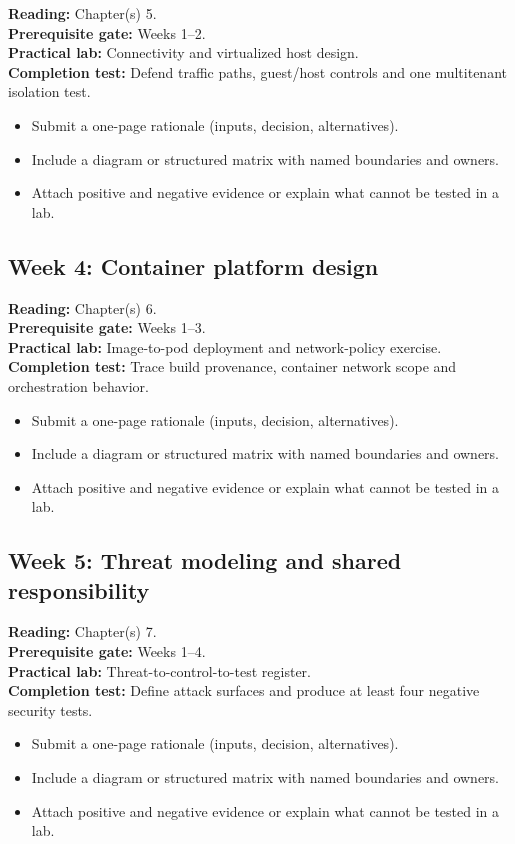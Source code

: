 \documentclass[10pt,letterpaper]{article}
\begin{document}
\textbf{Reading:} Chapter(s) 5.\\
\textbf{Prerequisite gate:} Weeks 1--2.\\
\textbf{Practical lab:} Connectivity and virtualized host design.\\
\textbf{Completion test:} Defend traffic paths, guest/host controls and one multitenant isolation test.
\begin{itemize}
\item Submit a one-page rationale (inputs, decision, alternatives).
\item Include a diagram or structured matrix with named boundaries and owners.
\item Attach positive and negative evidence or explain what cannot be tested in a lab.
\end{itemize}
\subsection{Week 4: Container platform design}
\textbf{Reading:} Chapter(s) 6.\\
\textbf{Prerequisite gate:} Weeks 1--3.\\
\textbf{Practical lab:} Image-to-pod deployment and network-policy exercise.\\
\textbf{Completion test:} Trace build provenance, container network scope and orchestration behavior.
\begin{itemize}
\item Submit a one-page rationale (inputs, decision, alternatives).
\item Include a diagram or structured matrix with named boundaries and owners.
\item Attach positive and negative evidence or explain what cannot be tested in a lab.
\end{itemize}
\subsection{Week 5: Threat modeling and shared responsibility}
\textbf{Reading:} Chapter(s) 7.\\
\textbf{Prerequisite gate:} Weeks 1--4.\\
\textbf{Practical lab:} Threat-to-control-to-test register.\\
\textbf{Completion test:} Define attack surfaces and produce at least four negative security tests.
\begin{itemize}
\item Submit a one-page rationale (inputs, decision, alternatives).
\item Include a diagram or structured matrix with named boundaries and owners.
\item Attach positive and negative evidence or explain what cannot be tested in a lab.
\end{itemize}
\end{document}
